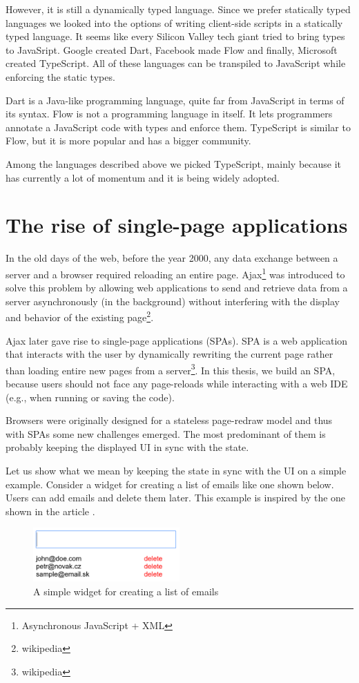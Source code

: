 However, it is still a dynamically typed language. Since we prefer statically typed languages we looked into the options of writing client-side scripts in
a statically typed language. It seems like every Silicon Valley tech giant tried to bring types to JavaSript. Google created Dart,
Facebook made Flow and finally, Microsoft created TypeScript. All of these languages can be transpiled to JavaScript while enforcing the static types.

Dart is a Java-like programming language, quite far from JavaScript in terms of its syntax. Flow is not a programming language in itself. It lets programmers
annotate a JavaScript code with types and enforce them. TypeScript is similar to Flow, but it is more popular and has a bigger community.

Among the languages described above we picked TypeScript, mainly because it has currently a lot of momentum and it is being widely adopted.

\section{The rise of single-page applications}
In the old days of the web, before the year 2000, any data exchange between a server and a browser required reloading an entire page. 
Ajax\footnote{Asynchronous JavaScript + XML} was introduced to solve this problem by allowing web applications to send and retrieve data from
a server asynchronously (in the background) without interfering with the display and behavior of the existing page\footnote{wikipedia}.

Ajax later gave rise to single-page applications (SPAs). SPA is a web application that interacts with the user by dynamically rewriting
the current page rather than loading entire new pages from a server\footnote{wikipedia}. In this thesis, we build an SPA, because users should not
face any page-reloads while interacting with a web IDE (e.g., when running or saving the code).  

Browsers were originally designed for a stateless page-redraw model and thus with SPAs some new challenges emerged. The most predominant of them is
probably keeping the displayed UI in sync with the state.

Let us show what we mean by keeping the state in sync with the UI on a simple example. Consider a widget for creating a list of emails like one shown below.
Users can add emails and delete them later. This example is inspired by the one shown in the article \cite{JSFramework}.
\begin{figure}[!hbt]
    \centering
	\includegraphics[width=0.5\textwidth]{../img/emails}
	\caption{A simple widget for creating a list of emails}
	\label{fig:chap2:emails}
\end{figure}

